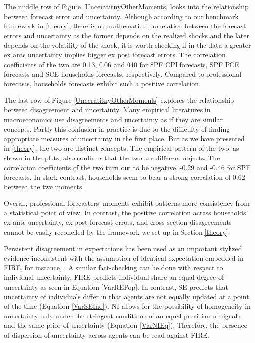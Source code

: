 \documentclass[]{article}
\begin{document}
	The middle row of Figure \ref{UnceratitnyOtherMoments} looks into the relationship between forecast error and uncertainty. Although according to our benchmark framework in \ref{theory}, there is no mathematical correlation between the forecast errors and uncertainty as the former depends on the realized shocks and the later depends on the volatility of the shock, it is worth checking if in the data a greater ex ante uncertainty implies bigger ex post forecast errors. The correlation coefficients of the two are 0.13, 0.06 and 040 for SPF CPI forecasts, SPF PCE forecasts and SCE households forecasts, respectively. Compared to professional forecasts, households forecasts exhibit such a positive correlation. 
	
	The last row of Figure \ref{UnceratitnyOtherMoments} explores the relationship between disagreement and uncertainty. Many empirical literatures in macroeconomics use disagreements and uncertainty as if they are similar concepts. Partly this confusion in practice is due to the difficulty of finding appropriate measures of uncertainty in the first place. But as we have presented in \ref{theory}, the two are distinct concepts. The empirical pattern of the two,  as shown in the plots, also confirms that the two are different objects. The correlation coefficients of the two turn out to be negative, -0.29 and -0.46 for SPF forecasts. In stark contrast, households seem to bear a strong correlation of 0.62 between the two moments.  
	
	Overall, professional forecasters' moments exhibit patterns more consistency from a statistical point of view.  In contrast, the positive correlation across households' ex ante uncertainty, ex post forecast errors, and cross-section disagreements cannot be easily reconciled by the framework we set up in Section \ref{theory}. 
	
	Persistent disagreement in expectations has been used as an important stylized evidence inconsistent with the assumption of identical expectation embedded in FIRE, for instance, \citet{mankiw2003disagreement}. A similar fact-checking can be done with respect to individual uncertainty. FIRE predicts individual share an equal degree of uncertainty as  seen in Equation \ref{VarREPop}. In contrast, SE predicts that uncertainty of individuals differ in that agents are not equally updated at a point of the time (Equation \ref{VarSEInd}). NI allows for the possibility of homogeneity in uncertainty only under the stringent conditions of an equal precision of signals and the same prior of uncertainty (Equation \ref{VarNIEq}). Therefore, the presence of dispersion of uncertainty across agents can be read against FIRE.  
	
\end{document}
